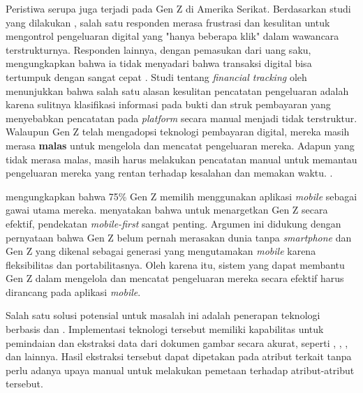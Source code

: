 Peristiwa serupa juga terjadi pada Gen Z di Amerika Serikat. Berdasarkan studi yang dilakukan , salah satu responden merasa frustrasi dan kesulitan untuk mengontrol pengeluaran digital yang "hanya beberapa klik" dalam wawancara terstrukturnya. Responden lainnya, dengan pemasukan dari uang saku, mengungkapkan bahwa ia tidak menyadari bahwa transaksi digital bisa tertumpuk dengan sangat cepat \parencite{lewis2019follow}. Studi tentang \emph{financial tracking} oleh  menunjukkan bahwa salah satu alasan kesulitan pencatatan pengeluaran adalah karena sulitnya klasifikasi informasi pada bukti dan struk pembayaran yang menyebabkan pencatatan pada \emph{platform} secara manual menjadi tidak terstruktur. Walaupun Gen Z telah mengadopsi teknologi pembayaran digital, mereka masih merasa \textbf{malas} untuk mengelola dan mencatat pengeluaran mereka. Adapun yang tidak merasa malas, masih harus melakukan pencatatan manual untuk memantau pengeluaran mereka yang rentan terhadap kesalahan dan memakan waktu. \parencite{lewis2019bart} \parencite{lewis2018sus} \parencite{lewis2019follow}.

 mengungkapkan bahwa 75\% Gen Z memilih menggunakan aplikasi \emph{mobile} sebagai gawai utama mereka.  menyatakan bahwa untuk menargetkan Gen Z secara efektif, pendekatan \emph{mobile-first} sangat penting. Argumen ini didukung dengan pernyataan bahwa Gen Z belum pernah merasakan dunia tanpa \emph{smartphone} dan Gen Z yang dikenal sebagai generasi yang mengutamakan \emph{mobile} karena fleksibilitas dan portabilitasnya. Oleh karena itu, sistem yang dapat membantu Gen Z dalam mengelola dan mencatat pengeluaran mereka secara efektif harus dirancang pada aplikasi \emph{mobile}.

Salah satu solusi potensial untuk masalah ini adalah penerapan teknologi berbasis \cvfull{} dan \dl{}. Implementasi teknologi tersebut memiliki kapabilitas untuk pemindaian dan ekstraksi data dari dokumen gambar secara akurat, seperti \ocrfull, \cnnfull, \transformer, dan lainnya. Hasil ekstraksi tersebut dapat dipetakan pada atribut terkait tanpa perlu adanya upaya manual untuk melakukan pemetaan terhadap atribut-atribut tersebut.


